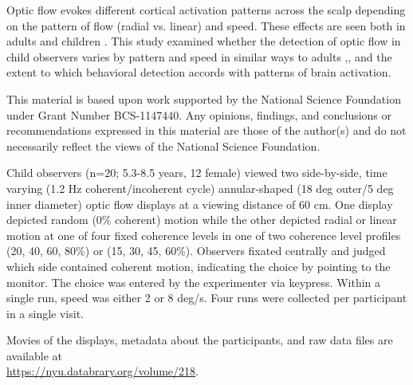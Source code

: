 \documentclass[landscape,final,a0paper,fontscale=0.285]{baposter}
\begin{document}
\begin{poster}
    {
  Optic flow evokes different cortical activation patterns across the scalp depending on the pattern of flow (radial vs. linear) and speed. These effects are seen both in adults \cite{fesi_cortical_2014} and children \cite{gilmore_childrens_2016}. 
  This study examined whether the detection of optic flow in child observers varies by pattern and speed in similar ways to adults \cite{adamiak_adult_observer_2015},\cite{adamiak_adult_2015}, and the extent to which behavioral detection accords with patterns of brain activation.
    }

    {
      This material is based upon work supported by the National Science Foundation under Grant Number BCS-1147440. Any opinions, findings, and conclusions or recommendations expressed in this material are those of the author(s) and do not necessarily reflect the views of the National Science Foundation. 
    }

    {
      Child observers (n=20; 5.3-8.5 years, 12 female) viewed two side-by-side, time varying (1.2 Hz coherent/incoherent cycle) annular-shaped (18 deg outer/5 deg inner diameter) optic flow displays at a viewing distance of 60 cm. One display depicted random (0\% coherent) motion while the other depicted radial or linear motion at one of four fixed coherence levels in one of two coherence level profiles (20, 40, 60, 80\%) or (15, 30, 45, 60\%). Observers fixated centrally and judged which side contained coherent motion, indicating the choice by pointing to the monitor. The choice was entered by the experimenter via keypress. Within a single run, speed was either 2 or 8 deg/s. Four runs were collected per participant in a single visit.
    }

     {
       Movies of the displays, metadata about the participants, and raw data files are available at \\
       \url{https://nyu.databrary.org/volume/218}.
     }


\end{poster}
\end{document}
